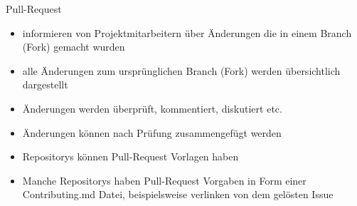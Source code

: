 \documentclass[compress,aspectratio=169]{beamer}
\begin{document}
\begin{frame}{Pull-Request}
\label{frame:Pull-Request}
		\begin{itemize}
            		\item informieren von Projektmitarbeitern über Änderungen die in einem Branch (Fork) gemacht wurden
              \item alle Änderungen zum ursprünglichen Branch (Fork) werden übersichtlich dargestellt
              \item Änderungen werden überprüft, kommentiert, diskutiert etc.
              \item Änderungen können nach Prüfung zusammengefügt werden
              \item Repositorys können Pull-Request Vorlagen haben
              \item Manche Repositorys haben Pull-Request Vorgaben in Form einer \glqq Contributing.md\grqq{} Datei, beispielsweise verlinken von dem gelösten Issue
		\end{itemize}
\end{frame}
\end{document}
